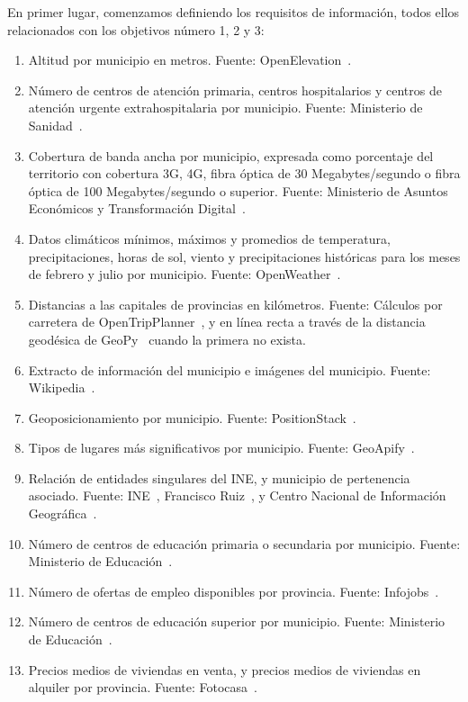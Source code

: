 En primer lugar, comenzamos definiendo los requisitos de información, todos ellos relacionados con los objetivos número 1, 2 y 3:

\begin{enumerate}
    \item Altitud por municipio en metros. Fuente: OpenElevation~\cite{openelevation}. 
    \item Número de centros de atención primaria, centros hospitalarios y centros de atención urgente extrahospitalaria por municipio. Fuente: Ministerio de Sanidad~\cite{salud}.
    \item Cobertura de banda ancha por municipio, expresada como porcentaje del territorio con cobertura 3G, 4G, fibra óptica de 30 Megabytes/segundo o fibra óptica de 100 Megabytes/segundo o superior. Fuente: Ministerio de Asuntos Económicos y Transformación Digital~\cite{cobertura}.
    \item Datos climáticos mínimos, máximos y promedios de temperatura, precipitaciones, horas de sol, viento y precipitaciones históricas para los meses de febrero y julio por municipio. Fuente: OpenWeather~\cite{openweather}.
    \item Distancias a las capitales de provincias en kilómetros. Fuente: Cálculos por carretera de OpenTripPlanner~\cite{otp}, y en línea recta a través de la distancia geodésica de GeoPy~\cite{GeoPy} cuando la primera no exista.
    \item Extracto de información del municipio e imágenes del municipio. Fuente: Wikipedia~\cite{wikipedia_api}.
    \item Geoposicionamiento por municipio. Fuente: PositionStack~\cite{positionstack}.
    \item Tipos de lugares más significativos por municipio. Fuente: GeoApify~\cite{geoapify}.
    \item Relación de entidades singulares del INE, y municipio de pertenencia asociado. Fuente: INE~\cite{municipios_ine}, Francisco Ruiz~\cite{entidades}, y Centro Nacional de Información Geográfica~\cite{nomenclator}.
    \item Número de centros de educación primaria o secundaria por municipio. Fuente: Ministerio de Educación~\cite{colegios}.
    \item Número de ofertas de empleo disponibles por provincia. Fuente: Infojobs~\cite{infojobs}.
    \item Número de centros de educación superior por municipio. Fuente: Ministerio de Educación~\cite{universidades}.
    \item Precios medios de viviendas en venta, y precios medios de viviendas en alquiler por provincia. Fuente: Fotocasa~\cite{fotocasa}.

\end{enumerate}
